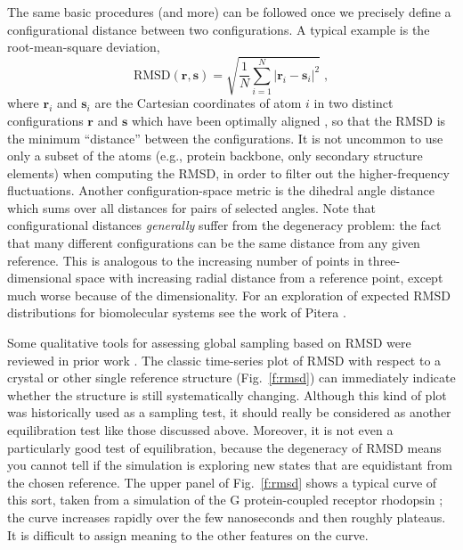 The same basic procedures (and more) can be followed once we precisely define a configurational distance between two configurations.  A typical example is the root-mean-square deviation,
\begin{equation}
\label{eq:rmsd}
\mathrm{RMSD}(\mathbf{r}, \mathbf{s}) = \sqrt{\frac{1}{N}\sum_{i=1}^{N} \left| \mathbf{r}_i - \mathbf{s}_i \right|^2} \;,
\end{equation}
where $\mathbf{r}_i$ and $\mathbf{s}_i$ are the Cartesian coordinates of atom $i$ in two distinct configurations $\mathbf{r}$ and $\mathbf{s}$ which have been optimally aligned \cite{Kabsch1976}, so that the RMSD is the minimum ``distance'' between the configurations.
It is not uncommon to use only a subset of the atoms (e.g., protein backbone, only secondary structure elements) when computing the RMSD, in order to filter out the higher-frequency fluctuations.
Another configuration-space metric is the dihedral angle distance which sums over all distances for pairs of selected angles.
Note that configurational distances \emph{generally} suffer from the degeneracy problem: the fact that many different configurations can be the same distance from any given reference.  This is analogous to
the increasing number of points in three-dimensional space
with increasing radial distance from a reference point, except
much worse because of the dimensionality.  For an
exploration of expected RMSD distributions for biomolecular
systems see the work of Pitera \cite{Pitera2014}.


Some qualitative tools for assessing global sampling based on RMSD were reviewed
in prior work \cite{Grossfield2009}.   The classic time-series plot of RMSD with
respect to a crystal or other single reference structure (Fig.\ \ref{f:rmsd}) can immediately
indicate whether the structure is still systematically changing.  Although this
kind of plot was historically used as a sampling test, it should really be
considered as another equilibration test like those discussed above.  Moreover,
it is not even a particularly good test of equilibration, because the degeneracy
of RMSD means you cannot tell if the simulation is exploring new states that are
equidistant from the chosen reference.  The upper panel of Fig.\ \ref{f:rmsd}
shows a typical curve of this sort, taken from a simulation of the G
protein-coupled receptor rhodopsin \cite{Grossfield-2015}; the curve increases
rapidly over the few nanoseconds and then roughly plateaus.  It is difficult to
assign meaning to the other features on the curve.


